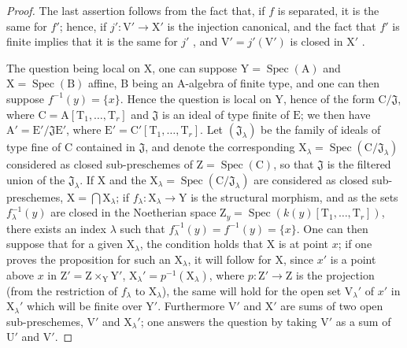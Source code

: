\begin{proof}
The last assertion follows from the fact that, if $f$ is separated, it is the same for $f'$; hence, if $j':\mathrm{V}'\to\mathrm{X}'$ is the injection canonical, and the fact that $f'$ is finite implies that it is the same for $j'$ , and $\mathrm{V}'=j'(\mathrm{V}')$ is closed in $\mathrm{X}'$ .

The question being local on $\mathrm{X}$, one can suppose $\mathrm{Y}=\operatorname{Spec}(\mathrm{A})$ and $\mathrm{X}=\operatorname{Spec}(\mathrm{B})$ affine, $\mathrm{B}$ being an $\mathrm{A}$-algebra of finite type, and one can then suppose $f^{-1}(y)=\{x\}$.
Hence the question is local on $\mathrm{Y}$, hence of the form $\mathrm{C}/\mathfrak{J}$, where $\mathrm{C}=\mathrm{A}[\mathrm{T}_1,\ldots,\mathrm{T}_r]$ and $\mathfrak{J}$ is an ideal of type finite of $\mathrm{E}$; we then have $\mathrm{A}'=\mathrm{E}'/\mathfrak{J}\mathrm{E}'$, where $\mathrm{E}'=\mathrm{C}'[\mathrm{T}_1,\ldots,\mathrm{T}_r]$.
Let $(\mathfrak{J}_\lambda)$ be the family of ideals of type fine of $\mathrm{C}$ contained in $\mathfrak{J}$, and denote the corresponding $\mathrm{X}_\lambda=\operatorname{Spec}(\mathrm{C}/\mathfrak{J}_\lambda)$ considered as closed sub-preschemes of $\mathrm{Z}=\operatorname{Spec}(\mathrm{C})$, so that $\mathfrak{J}$ is the filtered union of the $\mathfrak{J}_\lambda$.
If $\mathrm{X}$ and the $\mathrm{X}_\lambda=\operatorname{Spec}(\mathrm{C}/\mathfrak{J}_\lambda)$ are considered as closed sub-preschemes, $\mathrm{X}=\bigcap\mathrm{X}_\lambda$; if $f_\lambda:\mathrm{X}_\lambda\to\mathrm{Y}$ is the structural morphism, and as the sets $f_\lambda^{-1}(y)$ are closed in the Noetherian space $\mathrm{Z}_y=\operatorname{Spec}(k(y)[\mathrm{T}_1,\ldots,\mathrm{T}_r])$, there exists an index $\lambda$ such that $f_\lambda^{-1}(y)=f^{-1}(y)=\{x\}$.
One can then suppose that for a given $\mathrm{X}_\lambda$, the condition holds that $\mathrm{X}$ is at point $x$; if one proves the proposition for such an $\mathrm{X}_\lambda$, it will follow for $\mathrm{X}$, since $x'$ is a point above $x$ in $\mathrm{Z}'=\mathrm{Z}\times_\mathrm{Y}\mathrm{Y}'$, $\mathrm{X}_\lambda'=p^{-1}(\mathrm{X}_\lambda)$, where $p:\mathrm{Z}'\to\mathrm{Z}$ is the projection (from the restriction of $f_\lambda$ to $\mathrm{X}_\lambda$), the same will hold for the open set $\mathrm{V}_\lambda'$ of $x'$ in $\mathrm{X}_\lambda'$ which will be finite over $\mathrm{Y}'$.
Furthermore $\mathrm{V}'$ and $\mathrm{X}'$ are sums of two open sub-preschemes, $\mathrm{V}'$ and $\mathrm{X}_\lambda'$; one answers the question by taking $\mathrm{V}'$ as a sum of $\mathrm{U}'$ and $\mathrm{V}'$.

\end{proof}
